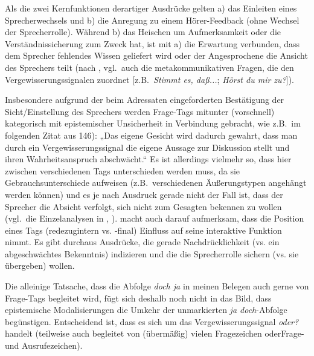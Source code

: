 Als die zwei Kernfunktionen derartiger Ausdrücke gelten a) das Einleiten eines Sprecherwechsels und b) die Anregung zu einem Hörer-Feedback (ohne Wechsel der Sprecherrolle). Während b) das Heischen um Aufmerksamkeit oder die Verständnissicherung zum Zweck hat, ist mit a) die Erwartung verbunden, dass dem Sprecher fehlendes Wissen geliefert wird oder der Angesprochene die Ansicht des Sprechers teilt (nach \citealt[146]{Hagemann2009}, vgl.\ auch die metakommunikativen Fragen, die \citealt[73]{Willkop1988} den Vergewisserungssignalen zuordnet [z.B.\ \textit{Stimmt es, daß...}; \textit{Hörst du mir zu?}]). 

Insbesondere aufgrund der beim Adressaten eingeforderten Bestätigung der Sicht/Einstellung des Sprechers werden Frage-Tags  mitunter (vorschnell) kategorisch mit epistemischer Unsicherheit in Verbindung gebracht, wie z.B.\ im folgenden Zitat aus \citet[146]{Imo2011} 146): „Das eigene Gesicht wird dadurch gewahrt, dass man durch ein Vergewisserungssignal die eigene Aussage zur Diskussion stellt und ihren Wahrheitsanspruch abschwächt.“ Es ist allerdings vielmehr so, dass hier zwischen verschiedenen Tags unterschieden werden muss, da sie Gebrauchsunterschiede aufweisen (z.B.\ verschiedenen Äußerungstypen angehängt werden können) und es je nach Ausdruck gerade nicht der Fall ist, dass der Sprecher die Absicht verfolgt, sich nicht zum Gesagten bekennen zu wollen (vgl.\ die Einzelanalysen in \citealt[125--134]{Bublitz1978}, \citealt[253--261, 262--270, 271--275]{Willkop1988}). \citet{Hagemann2009} macht auch darauf aufmerksam, dass die Position eines Tags (redezugintern vs. -final) Einfluss auf seine interaktive Funktion nimmt. Es gibt durchaus Ausdrücke, die gerade Nachdrücklichkeit (vs. ein abgeschwächtes Be\-kenntnis) indizieren und die die Sprecherrolle sichern (vs. sie übergeben) wollen. 

Die alleinige Tatsache, dass die Abfolge \textit{doch ja} in meinen Belegen auch gerne von Frage-Tags begleitet wird, fügt sich deshalb noch nicht in das Bild, dass epistemische Modalisierungen  die Umkehr der unmarkierten \textit{ja doch}-Abfolge begünstigen. Entscheidend ist, dass es sich um das Vergewisserungssignal \textit{oder?} handelt (teilweise auch begleitet von (übermäßig) vielen Fragezeichen oder\linebreak Frage- und Ausrufezeichen).

